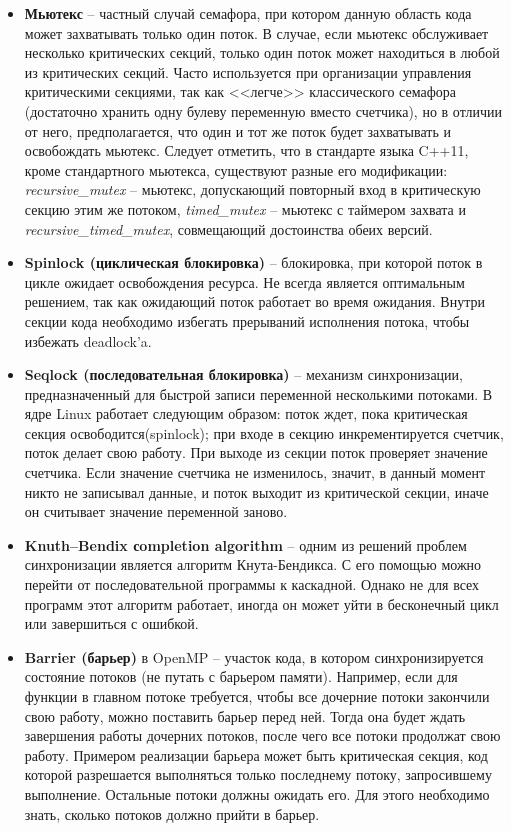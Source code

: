 \begin{itemize}
    \item{\textbf{Мьютекс} -- частный случай семафора, при котором данную область кода может захватывать только один поток. В случае, если мьютекс обслуживает несколько критических секций, только один поток может находиться в любой из критических секций. Часто используется при организации управления критическими секциями, так как <<легче>> классического семафора (достаточно хранить одну булеву переменную вместо счетчика), но в отличии от него, предполагается, что один и тот же поток будет захватывать и освобождать мьютекс. Следует отметить, что в стандарте языка C++11, кроме стандартного мьютекса, существуют разные его модификации:  \textit{recursive\_mutex} -- мьютекс, допускающий повторный вход в критическую секцию этим же потоком, 
    \textit{timed\_mutex} -- мьютекс с таймером захвата и  \textit{recursive\_timed\_mutex}, совмещающий достоинства обеих версий.}
    
    \item\textbf{Spinlock (циклическая блокировка)} -- блокировка, при которой поток в цикле ожидает освобождения ресурса. Не всегда является оптимальным решением, так как ожидающий поток работает во время ожидания. Внутри секции кода необходимо избегать прерываний исполнения потока, чтобы избежать deadlock'a.
    
    \item\textbf{Seqlock (последовательная блокировка)} -- механизм синхронизации, предназначенный для быстрой записи переменной несколькими потоками. В ядре Linux работает следующим образом: поток ждет, пока критическая секция освободится(spinlock); при входе в секцию инкрементируется счетчик, поток делает свою работу. При выходе из секции поток проверяет значение счетчика. Если значение счетчика не изменилось, значит, в данный момент никто не записывал данные, и поток выходит из критической секции, иначе он считывает значение переменной заново.
    
    \item\textbf{Knuth–Bendix сompletion algorithm} -- одним из решений проблем синхронизации является алгоритм Кнута-Бендикса. С его помощью можно перейти от последовательной программы к каскадной. Однако не для всех программ этот алгоритм работает, иногда он может уйти в бесконечный цикл или завершиться с ошибкой.
    
    \item\textbf{Barrier (барьер)} в OpenMP -- участок кода, в котором синхронизируется состояние потоков (не путать с барьером памяти). Например, если для функции в главном потоке требуется, чтобы все дочерние потоки закончили свою работу, можно поставить барьер перед ней. Тогда она будет ждать завершения работы дочерних потоков, после чего все потоки продолжат свою работу. Примером реализации барьера может быть критическая секция, код которой разрешается выполняться только последнему потоку, запросившему выполнение. Остальные потоки должны ожидать его. Для этого необходимо знать, сколько потоков должно прийти в барьер.
    

\end{itemize}

